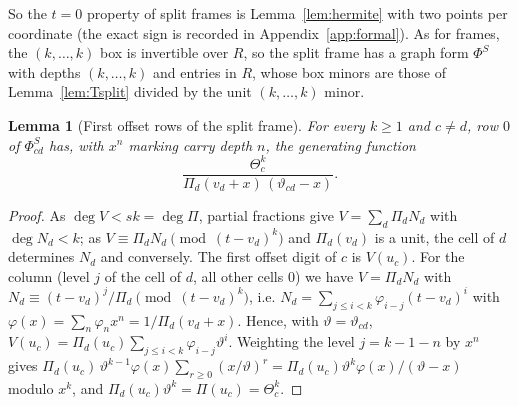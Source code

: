\documentclass[11pt]{amsart}
\newtheorem{lemma}[theorem]{Lemma}
\theoremstyle{definition}
\theoremstyle{plain}
\begin{document}
So the $t=0$ property of split frames is Lemma~\ref{lem:hermite} with two points per coordinate (the exact sign is recorded in Appendix~\ref{app:formal}). As for frames, the $(k,\dots,k)$ box is invertible over $R$, so the split frame has a graph form $\Phi^S$ with depths $(k,\dots,k)$ and entries in $R$, whose box minors are those of Lemma~\ref{lem:Tsplit} divided by the unit $(k,\dots,k)$ minor.

\begin{lemma}[First offset rows of the split frame]\label{lem:Rsplit}
For every $k\ge1$ and $c\ne d$, row $0$ of $\Phi^S_{cd}$ has, with $x^n$ marking carry depth $n$, the generating function
\[
\frac{\Theta_c^k}{\Pi_d(v_d+x)\,(\vartheta_{cd}-x)}.
\]
\end{lemma}

\begin{proof}
As $\deg V<sk=\deg\Pi$, partial fractions give $V=\sum_d\Pi_dN_d$ with $\deg N_d<k$; as $V\equiv\Pi_dN_d\pmod{(t-v_d)^k}$ and $\Pi_d(v_d)$ is a unit, the cell of $d$ determines $N_d$ and conversely. The first offset digit of $c$ is $V(u_c)$. For the column (level $j$ of the cell of $d$, all other cells $0$) we have $V=\Pi_dN_d$ with $N_d\equiv(t-v_d)^j/\Pi_d\pmod{(t-v_d)^k}$, i.e. $N_d=\sum_{j\le i<k}\varphi_{i-j}(t-v_d)^i$ with $\varphi(x)=\sum_n\varphi_nx^n=1/\Pi_d(v_d+x)$. Hence, with $\vartheta=\vartheta_{cd}$, $V(u_c)=\Pi_d(u_c)\sum_{j\le i<k}\varphi_{i-j}\vartheta^i$. Weighting the level $j=k-1-n$ by $x^n$ gives $\Pi_d(u_c)\,\vartheta^{k-1}\varphi(x)\sum_{r\ge0}(x/\vartheta)^r=\Pi_d(u_c)\vartheta^k\varphi(x)/(\vartheta-x)$ modulo $x^k$, and $\Pi_d(u_c)\vartheta^k=\Pi(u_c)=\Theta_c^k$.
\end{proof}
\end{document}
